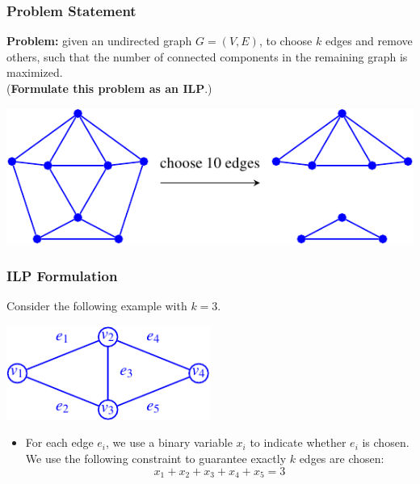 \frame
{
	\frametitle{Problem Statement}

	\vspace{-0.3cm}	

	{\bf Problem:} given an undirected graph $G=(V,E)$, to choose $k$ edges and remove others,
	such that the number of connected components in the remaining graph is maximized. \\
	({\bf Formulate this problem as an ILP}.)

	\vspace{0.6cm}	

	\begin{center}
	\includegraphics[width=\textwidth]{Lec8-Genome-Rearrangement-Problem-figs/star.pdf}
	\end{center}
}

\frame
{
	\frametitle{ILP Formulation}

	Consider the following example with $k = 3$.

	\begin{center}
	\includegraphics[width=0.5\textwidth]{Lec8-Genome-Rearrangement-Problem-figs/example.pdf}
	\end{center}

	\begin{itemize}
	\item<2-> For each edge $e_i$, we use a binary variable $x_i$ to indicate whether $e_i$ is chosen.
		We use the following constraint to guarantee exactly $k$ edges are chosen:
		\begin{displaymath}
			x_1 + x_2 + x_3 + x_4 + x_5 = 3
		\end{displaymath}
	\end{itemize}

}

